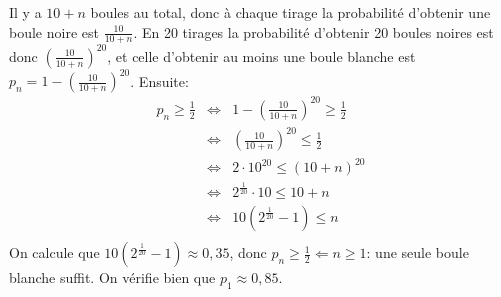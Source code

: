 Il y a $10+n$ boules au total, donc \`a chaque tirage la probabilité d'obtenir une boule noire est $\frac{10}{10+n}$. En 20 tirages la probabilité d'obtenir 20 boules noires est donc $\left(\frac{10}{10+n}\right)^{20}$, et celle d'obtenir au moins une boule blanche est $p_n=1-\left(\frac{10}{10+n}\right)^{20}$. Ensuite:
\begin{eqnarray*}
  p_n \geq \frac{1}{2} &\Leftrightarrow& 1-\left(\frac{10}{10+n}\right)^{20} \geq \frac{1}{2} \\
  &\Leftrightarrow& \left(\frac{10}{10+n}\right)^{20} \leq \frac{1}{2} \\
  &\Leftrightarrow& 2\cdot 10^{20} \leq (10+n)^{20}\\
  &\Leftrightarrow& 2^{\frac{1}{20}}\cdot 10 \leq 10+n\\
  &\Leftrightarrow& 10\left( 2^{\frac{1}{20}} -1\right) \leq n\\
\end{eqnarray*}
On calcule que $10\left( 2^{\frac{1}{20}} -1\right)\approx 0,35$, donc $p_n\geq \frac{1}{2} \Leftarrow n\geq 1$: une seule boule blanche suffit. On vérifie bien que $p_1\approx 0,85$.\\ \\
